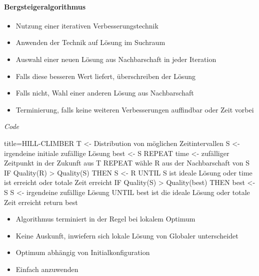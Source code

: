 \documentclass[
    ngerman,
    color=3b,
    dark_mode,
    load_common, %
    summary,
    boxarc,
]{tuda_summary}
\begin{document}
\paragraph{Bergsteigeralgorithmus}\mbox{}
\begin{idea}[Bergsteigeralgorithmus]\mbox{}
    \begin{itemize}
        \item Nutzung einer iterativen Verbesserungstechnik
        \item Anwenden der Technik auf  Lösung im Suchraum
        \item Auswahl einer neuen Lösung aus Nachbarschaft in jeder Iteration
        \item Falls diese besseren Wert liefert, überschreiben der  Lösung
        \item Falls nicht, Wahl einer anderen Lösung aus Nachbarschaft
        \item Terminierung, falls keine weiteren Verbesserungen auffindbar oder Zeit vorbei
    \end{itemize}
\end{idea}
\textit{Code}

\begin{codeBlock}[autogobble,fontsize=\small]{title={HILL-CLIMBER}}
    T <- Distribution von möglichen Zeitintervallen
    S <- irgendeine initiale zufällige Lösung
    best <- S
    REPEAT
        time <- zufälliger Zeitpunkt in der Zukunft aus T
        REPEAT
            wähle R aus der Nachbarschaft von S
            IF Quality(R) > Quality(S) THEN
                S <- R
        UNTIL S ist ideale Lösung oder time ist erreicht oder totale Zeit erreicht
        IF Quality(S) > Quality(best) THEN
            best <- S
        S <- irgendeine zufällige Lösung
    UNTIL best ist die ideale Lösung oder totale Zeit erreicht
    return best
\end{codeBlock}
\begin{description}[leftmargin=2cm,itemsep=1em]
    \item[Nachteile] \begin{itemize}
              \item Algorithmus terminiert in der Regel bei lokalem Optimum
              \item Keine Auskunft, inwiefern sich lokale Lösung von Globaler unterscheidet
              \item Optimum abhängig von Initialkonfiguration
          \end{itemize}
    \item[Vorteile] \begin{itemize}
              \item Einfach anzuwenden
          \end{itemize}
\end{description}
\end{document}
